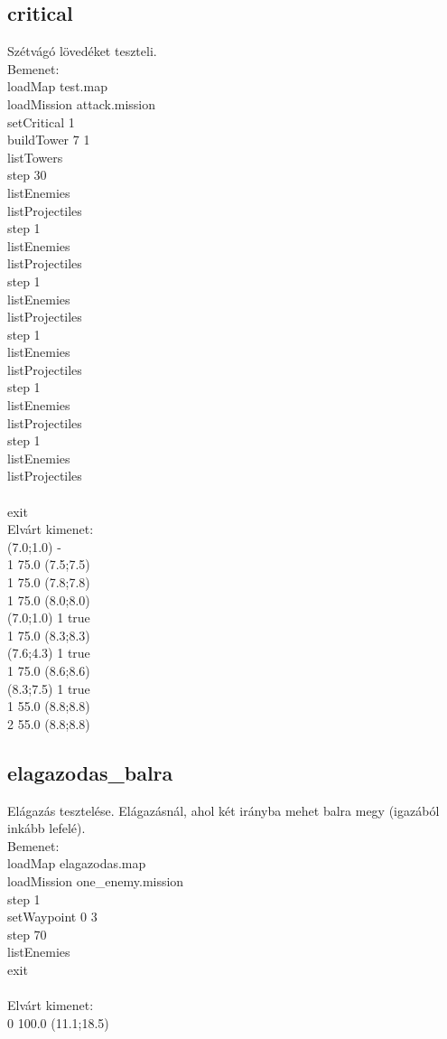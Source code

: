\subsection{critical}
Szétvágó lövedéket teszteli.\\
Bemenet:\\
loadMap test.map\\
loadMission attack.mission\\
setCritical 1\\
buildTower 7 1\\
listTowers\\
step 30\\
listEnemies\\
listProjectiles\\
step 1\\
listEnemies\\
listProjectiles\\
step 1\\
listEnemies\\
listProjectiles\\
step 1\\
listEnemies\\
listProjectiles\\
step 1\\
listEnemies\\
listProjectiles\\
step 1\\
listEnemies\\
listProjectiles\\
\\
exit\\
Elvárt kimenet:\\
(7.0;1.0) -\\
1 75.0 (7.5;7.5)\\
1 75.0 (7.8;7.8)\\
1 75.0 (8.0;8.0)\\
(7.0;1.0) 1 true\\
1 75.0 (8.3;8.3)\\
(7.6;4.3) 1 true\\
1 75.0 (8.6;8.6)\\
(8.3;7.5) 1 true\\
1 55.0 (8.8;8.8)\\
2 55.0 (8.8;8.8)\\
\subsection{elagazodas\_balra}
Elágazás tesztelése.
Elágazásnál, ahol két irányba mehet balra megy (igazából inkább lefelé).\\
Bemenet:\\
loadMap elagazodas.map\\
loadMission one\_enemy.mission\\
step 1\\
setWaypoint 0 3\\
step 70\\
listEnemies\\
exit\\
\\
Elvárt kimenet:\\
0 100.0 (11.1;18.5)\\
